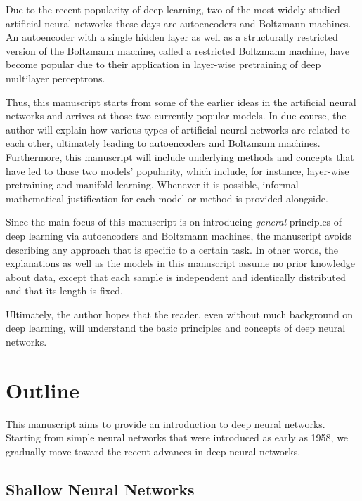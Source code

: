 \documentclass{now}
\begin{document}
Due to the recent popularity of deep learning, two of the most widely studied
artificial neural networks these days are autoencoders and Boltzmann machines.
An autoencoder with a single hidden layer as well as a structurally restricted
version of the Boltzmann machine, called a restricted Boltzmann machine, have
become popular due to their application in layer-wise pretraining of deep
multilayer perceptrons. 

Thus, this manuscript starts from some of the earlier ideas in the artificial
neural networks and arrives at those two currently popular models. In due
course, the author will explain how various types of artificial neural networks
are related to each other, ultimately leading to autoencoders and Boltzmann
machines. Furthermore, this manuscript will include underlying methods and concepts
that have led to those two models' popularity, which include, for instance,
layer-wise pretraining and manifold learning.  Whenever it is possible,
informal mathematical justification for each model or method is provided
alongside.

Since the main focus of this manuscript is on introducing \textit{general}
principles of deep learning via autoencoders and Boltzmann machines, the
manuscript avoids describing any approach that is specific to a certain task.
In other words, the explanations as well as the models in this manuscript
assume no prior knowledge about data, except that each sample is independent
and identically distributed and that its length is fixed. 

Ultimately, the author hopes that the reader, even without much background on
deep learning, will understand the basic principles and concepts of deep neural
networks. 


\section{Outline}

This manuscript aims to provide an introduction to deep neural networks.
Starting from simple neural networks that were introduced as early as 1958, we
gradually move toward the recent advances in deep neural networks. 
%

\subsection{Shallow Neural Networks}
\end{document}
